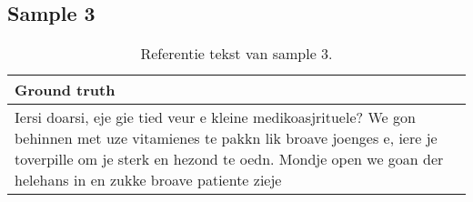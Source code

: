 \subsection{Sample 3}
\begin{table}[htbp]
    \centering
    \label{tab:groundtruth_sample3}
    \begin{tabularx}{\textwidth}{|X|}
        \hline
        \textbf{Ground truth} \\
        
        \hline
        Iersi doarsi, eje gie tied veur e kleine medikoasjrituele? We gon behinnen met uze vitamienes te pakkn lik broave joenges e, iere je toverpille om je sterk en hezond te oedn. Mondje open we goan der helehans in en zukke broave patiente zieje \\
        \hline
    \end{tabularx}
    \caption{Referentie tekst van sample 3.}
\end{table}

